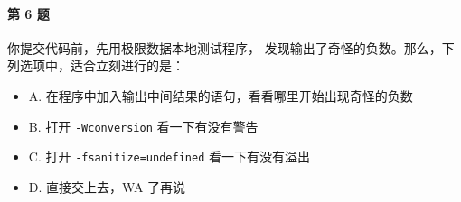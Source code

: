 \paragraph{第 6 题} 你提交代码前，先用极限数据本地测试程序，
发现输出了奇怪的负数。那么，下列选项中，适合立刻进行的是：
\begin{itemize}
	\item A. 在程序中加入输出中间结果的语句，看看哪里开始出现奇怪的负数
	\item B. 打开 \lstinline{-Wconversion} 看一下有没有警告
	\item C. 打开 \lstinline{-fsanitize=undefined} 看一下有没有溢出
	\item D. 直接交上去，WA 了再说
\end{itemize}
